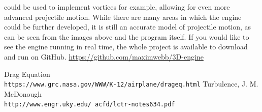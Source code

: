 \documentclass{article}
\begin{document}
\cite{turb}
could be used to implement vortices for example, allowing for even more advanced projectile motion.
\newline
\newline
While there are many areas in which the engine could be further developed, it is still an accurate model of projectile motion, as can be seen from the images above and the program itself. If you would like to see the engine running in real time, the whole project is available to download and run on GitHub. \href{https://github.com/maximwebb/3D-engine}{\color{blue} https://github.com/maximwebb/3D-engine}\color{black}

\newpage
\begin{thebibliography}{2}
Drag Equation
\\\texttt{https://www.grc.nasa.gov/WWW/K-12/airplane/drageq.html}
Turbulence, J. M. McDonough
\\\texttt{http://www.engr.uky.edu/~acfd/lctr-notes634.pdf}
\end{thebibliography}
\end{document}

